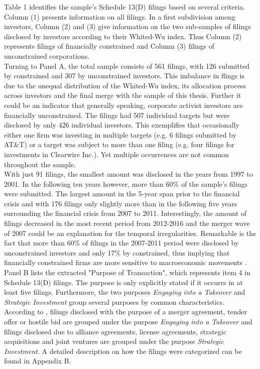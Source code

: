\documentclass[12pt]{article}
\begin{document}
Table 1 identifies the sample's Schedule 13(D) filings based on several criteria. Column (1) presents information on all filings. In a first subdivision among investors, Column (2) and (3) give information on the two sub-samples of filings disclosed by investors according to their Whited-Wu index. Thus Column (2) represents filings of financially constrained and Column (3) filings of unconstrained corporations.\\
Turning to Panel A, the total sample consists of 561 filings, with 126 submitted by constrained and 307 by unconstrained investors. This imbalance in flings is due to the unequal distribution of the Whited-Wu index, its allocation process across investors and the final merge with the sample of this thesis. Further it could be an indicator that generally speaking, corporate activist investors are financially unconstrained. The filings had 507 individual targets but were disclosed by only 426 individual investors. This exemplifies that occasionally either one firm was investing in multiple targets (e.g. 6 filings submitted by AT\&T) or a target was subject to more than one filing (e.g. four filings for investments in Clearwire Inc.). Yet multiple occurrences are not common throughout the sample.\\ 
With just 91 filings, the smallest amount was disclosed in the years from 1997 to 2001. In the following ten years however, more than 60\% of the sample's filings were submitted. The largest amount in the 5-year span prior to the financial crisis and with 176 filings only slightly more than in the following five years surrounding the financial crisis from 2007 to 2011. Interestingly, the amount of filings decreased in the most recent period from 2012-2016 and the merger wave of 2007 \citep[p.19]{Huang2017} could be an explanation for the temporal irregularities. Remarkable is the fact that more than 60\% of filings in the 2007-2011 period were disclosed by unconstrained investors and only 17\% by constrained, thus implying that financially constrained firms are more sensitive to macroeconomic movements \citep[p.1197]{Campello2006}.\\
Panel B lists the extracted "Purpose of Transaction", which represents item 4 in Schedule 13(D) filings. The purpose is only explicitly stated if it occurrs in at least five filings. Furthermore, the two purposes \emph{Engaging into a Takeover} and \emph{Strategic Investment} group several purposes by common characteristics. According to \citet[p.1]{Betton2008}, filings disclosed with the purpose of a merger agreement, tender offer or hostile bid are grouped under the purpose \emph{Engaging into a Takeover} and filings disclosed due to alliance agreements, license agreements, strategic acquisitions and joint ventures are grouped under the purpose \emph{Strategic Investment}. A detailed description on how the filings were categorized can be found in Appendix B. 
\end{document}

